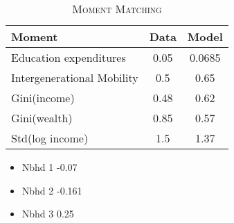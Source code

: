 \begin{landscape}
\begin{table}[h]
\begin{tabular}{@{}lccc@{}}
\bottomrule
\end{tabular}
\end{table}



\begin{table}[h]
\centering
\caption{\textsc{Moment Matching }}
\label{my-label}
\begin{tabular}{@{}lcc@{}}
\toprule
Moment & Data & Model  \\ \midrule
Education expenditures         & 0.05  & 0.0685    \\
Intergenerational Mobility     & 0.5	& 0.65	\\
Gini(income)		& 0.48	& 0.62	\\
Gini(wealth) 	& 0.85	& 0.57 \\
Std(log income)		& 1.5	 & 1.37	\\

\bottomrule
\end{tabular}
\end{table}


\end{landscape}
\restoregeometry
\begin{itemize}
\item Nbhd 1 -0.07
\item Nbhd 2 -0.161
\item Nbhd 3 0.25
\end{itemize}


